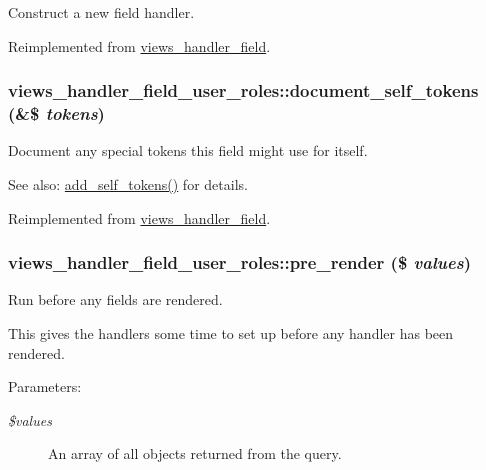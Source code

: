 Construct a new field handler. 

Reimplemented from \hyperlink{classviews__handler__field_3d50050864c255b71c842972a45d39f6}{views\_\-handler\_\-field}.\hypertarget{classviews__handler__field__user__roles_49745a7c1d16f9ee62d5ad6406fe0863}{
\subsubsection[{document\_\-self\_\-tokens}]{\setlength{\rightskip}{0pt plus 5cm}views\_\-handler\_\-field\_\-user\_\-roles::document\_\-self\_\-tokens (\&\$ {\em tokens})}}
\label{classviews__handler__field__user__roles_49745a7c1d16f9ee62d5ad6406fe0863}


Document any special tokens this field might use for itself.

\begin{Desc}
\item[See also:]\hyperlink{classviews__handler__field__user__roles_ceb9ebe1ca046eec3634c85bb6b114f5}{add\_\-self\_\-tokens()} for details. \end{Desc}


Reimplemented from \hyperlink{classviews__handler__field_e33446d1059f13fbfb06a37da04d320e}{views\_\-handler\_\-field}.\hypertarget{classviews__handler__field__user__roles_342d1bffbb0098a432ace0f838c63989}{
\subsubsection[{pre\_\-render}]{\setlength{\rightskip}{0pt plus 5cm}views\_\-handler\_\-field\_\-user\_\-roles::pre\_\-render (\$ {\em values})}}
\label{classviews__handler__field__user__roles_342d1bffbb0098a432ace0f838c63989}


Run before any fields are rendered.

This gives the handlers some time to set up before any handler has been rendered.

\begin{Desc}
\item[Parameters:]
\begin{description}
\item[{\em \$values}]An array of all objects returned from the query. \end{description}
\end{Desc}


